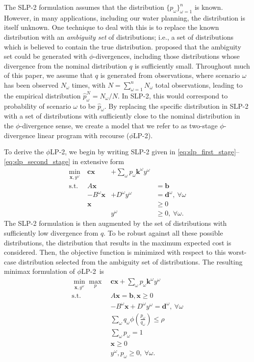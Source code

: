 \documentclass[ijoc,letterpaper]{informs3} %
\newcommand{\x}{\mathbf{x}}
\renewcommand{\c}{\mathbf{c}}
\renewcommand{\k}{\mathbf{k}}
\renewcommand{\b}{\mathbf{b}}
\renewcommand{\d}{\mathbf{d}}
\newcommand{\st}{\mbox{s.t.}}
\newcommand{\plp}{$\phi$LP-2}
\begin{document}
The SLP-2 formulation assumes that the distribution $\{p_\omega\}_{\omega=1}^n$ is known.
However, in many applications, including our water planning, the distribution is itself unknown.
One technique to deal with this is to replace the known distribution with an {\it ambiguity set} of distributions; i.e., a set of distributions which is believed to contain the true distribution.
\cite{bental2011robust} proposed that the ambiguity set could be generated with $\phi$-divergences, including those distributions whose divergence from the nominal distribution $q$ is sufficiently small.
Throughout much of this paper, we assume that $q$ is generated from observations, where scenario $\omega$ has been observed $N_\omega$ times, with $N = \sum_{\omega=1}^n N_\omega$ total observations, leading to the empirical distribution $\hat{p}^N_\omega = N_\omega / N$.
In SLP-2, this would correspond to probability of scenario $\omega$ to be $\hat{p}_\omega$.
By replacing the specific distribution in SLP-2 with a set of distributions with sufficiently close to the nominal distribution in the $\phi$-divergence sense, we create a model that we refer to as two-stage $\phi$-divergence linear program with recourse (\plp).

To derive the \plp, we begin by writing SLP-2 given in \eqref{eq:slp_first_stage}--\eqref{eq:slp_second_stage} in extensive form
\[
	\begin{array}{rrrl}
		\min_{\x,y^\omega} \ & \c\x & + \sum_\omega p_\omega \k^\omega y^\omega \label{eq:slp2cost} \\
		\st \ & A\x & & = \b \nonumber \\
		& -B^\omega \x & + D^\omega y^\omega & = \d^\omega,\ \forall \omega \nonumber \\
		& \x & & \geq 0 \nonumber \\
		& & y^\omega & \geq 0,\ \forall \omega. \nonumber
	\end{array}
\]
The SLP-2 formulation is then augmented by the set of distributions with sufficiently low divergence from $q$.
To be robust against all these possible distributions, the distribution that results in the maximum expected cost is considered.
Then, the objective function is minimized with respect to this worst-case distribution selected from the ambiguity set of distributions.
The resulting minimax formulation of \plp\ is
\begin{align}
	\min_{\x,y^\omega} \max_p \ & \c\x + \sum_\omega p_\omega \k^\omega y^\omega \label{eq:plp_primal}\\
	\st \ & A\x = \b, \x \geq 0 \nonumber \\
	& -B^\omega \x + D^\omega y^\omega = \d^\omega,\ \forall \omega \nonumber \\
	& \sum_\omega q_\omega \phi\left(\frac{p_\omega}{q_\omega}\right) \leq \rho \label{eq:plp_primal_divergence} \\
	& \sum_\omega p_\omega = 1 \label{eq:plp_primal_probability} \\
	& \x \geq 0 \nonumber \\
	& y^\omega, p_\omega \geq 0,\ \forall \omega. \label{eq:nonneg}
\end{align}
\end{document}
